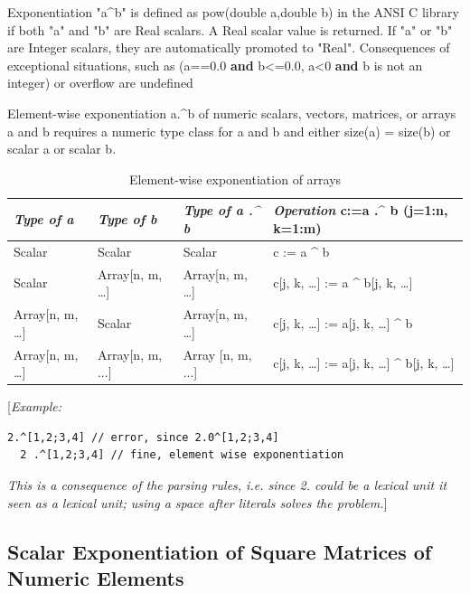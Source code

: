 \documentclass[10pt,a4paper]{report}
\def\doublelabel#1{\label{#1}\hypertarget{#1}{}}
\begin{document}
Exponentiation "a\^{}b" is defined as pow(double a,double b) in the ANSI
C library if both "a" and "b" are Real scalars. A Real scalar value is
returned. If "a" or "b" are Integer scalars, they are automatically
promoted to "Real". Consequences of exceptional situations, such as
(a==0.0 \textbf{and} b\textless{}=0.0, a\textless{}0 \textbf{and} b is
not an integer) or overflow are undefined

Element-wise exponentiation a.\^{}b of numeric scalars, vectors,
matrices, or arrays a and b requires a numeric type class for a and b
and either size(a) = size(b) or scalar a or scalar b.

\begin{longtable}[]{|l|l|l|l|}
\caption{Element-wise exponentiation of arrays}\\
\hline
\emph{Type of a} & \emph{Type of b} & \emph{Type of a .\^{} b} &
\emph{Operation} c:=a .\^{} b (j=1:n, k=1:m)\\ \hline
\endhead
Scalar & Scalar & Scalar & c := a \^{} b\\ \hline
Scalar & Array{[}n, m, \ldots{}{]} & Array{[}n, m, \ldots{}{]} & c{[}j,
k, \ldots{}{]} := a \^{} b{[}j, k, \ldots{}{]}\\ \hline
Array{[}n, m, \ldots{}{]} & Scalar & Array{[}n, m, \ldots{}{]} & c{[}j,
k, \ldots{}{]} := a{[}j, k, \ldots{}{]} \^{} b\\ \hline
Array{[}n, m, \ldots{}{]} & Array{[}n, m, ...{]} & Array {[}n, m, ...{]}
& c{[}j, k, \ldots{}{]} := a{[}j, k, \ldots{}{]} \^{} b{[}j, k,
\ldots{}{]}\\ \hline

\end{longtable}

{[}\emph{Example:}

\begin{lstlisting}[language=modelica]
  2.^[1,2;3,4] // error, since 2.0^[1,2;3,4]
  2 .^[1,2;3,4] // fine, element wise exponentiation
\end{lstlisting}
\emph{This is a consequence of the parsing rules, i.e. since 2. could be
a lexical unit it seen as a lexical unit; using a space after literals
solves the problem.}{]}

\subsection{Scalar Exponentiation of Square Matrices of Numeric Elements}\doublelabel{scalar-exponentiation-of-square-matrices-of-numeric-elements}
\end{document}
